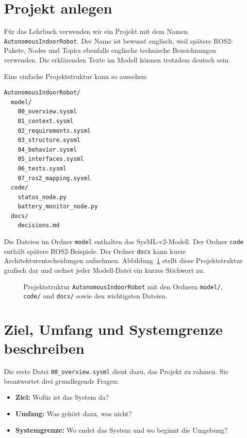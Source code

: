 \section{Projekt anlegen}
Für das Lehrbuch verwenden wir ein Projekt mit dem Namen \texttt{AutonomousIndoorRobot}. Der Name ist bewusst englisch, weil spätere ROS2-Pakete, Nodes und Topics ebenfalls englische technische Bezeichnungen verwenden. Die erklärenden Texte im Modell können trotzdem deutsch sein.

Eine einfache Projektstruktur kann so aussehen:

\begin{lstlisting}[style=plaintext]
AutonomousIndoorRobot/
  model/
    00_overview.sysml
    01_context.sysml
    02_requirements.sysml
    03_structure.sysml
    04_behavior.sysml
    05_interfaces.sysml
    06_tests.sysml
    07_ros2_mapping.sysml
  code/
    status_node.py
    battery_monitor_node.py
  docs/
    decisions.md
\end{lstlisting}

Die Dateien im Ordner \texttt{model} enthalten das SysML-v2-Modell. Der Ordner \texttt{code} enthält spätere ROS2-Beispiele. Der Ordner \texttt{docs} kann kurze Architekturentscheidungen aufnehmen. Abbildung~\ref{fig:kap04-projektstruktur} stellt diese Projektstruktur grafisch dar und ordnet jeder Modell-Datei ein kurzes Stichwort zu.

\begin{figure}[H]
  \centering
  \caption{Projektstruktur \texttt{AutonomousIndoorRobot} mit den Ordnern \texttt{model/}, \texttt{code/} und \texttt{docs/} sowie den wichtigsten Dateien.}
  \label{fig:kap04-projektstruktur}
\end{figure}

\section{Ziel, Umfang und Systemgrenze beschreiben}

Die erste Datei \texttt{00\_overview.sysml} dient dazu, das Projekt zu rahmen. Sie beantwortet drei grundlegende Fragen:

\begin{itemize}
    \item \textbf{Ziel:} Wofür ist das System da?
    \item \textbf{Umfang:} Was gehört dazu, was nicht?
    \item \textbf{Systemgrenze:} Wo endet das System und wo beginnt die Umgebung?
\end{itemize}


